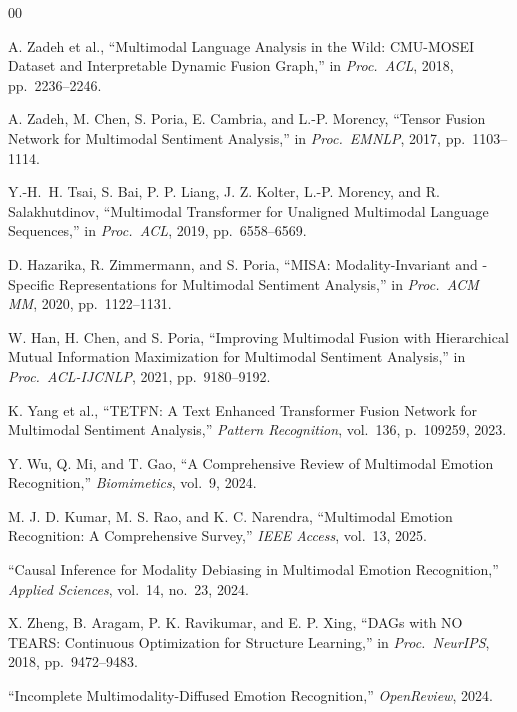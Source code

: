 \documentclass[conference]{IEEEtran}
\begin{document}
\begin{thebibliography}{00}

A. Zadeh et al., ``Multimodal Language Analysis in the Wild: CMU-MOSEI Dataset
and Interpretable Dynamic Fusion Graph,'' in \textit{Proc.\ ACL}, 2018,
pp.~2236--2246.

A. Zadeh, M. Chen, S. Poria, E. Cambria, and L.-P. Morency,
``Tensor Fusion Network for Multimodal Sentiment Analysis,''
in \textit{Proc.\ EMNLP}, 2017, pp.~1103--1114.

Y.-H.~H. Tsai, S. Bai, P. P. Liang, J. Z. Kolter, L.-P. Morency,
and R. Salakhutdinov, ``Multimodal Transformer for Unaligned Multimodal
Language Sequences,'' in \textit{Proc.\ ACL}, 2019, pp.~6558--6569.

D. Hazarika, R. Zimmermann, and S. Poria, ``MISA: Modality-Invariant and
-Specific Representations for Multimodal Sentiment Analysis,''
in \textit{Proc.\ ACM MM}, 2020, pp.~1122--1131.

W. Han, H. Chen, and S. Poria, ``Improving Multimodal Fusion with Hierarchical
Mutual Information Maximization for Multimodal Sentiment Analysis,''
in \textit{Proc.\ ACL-IJCNLP}, 2021, pp.~9180--9192.

K. Yang et al., ``TETFN: A Text Enhanced Transformer Fusion Network for
Multimodal Sentiment Analysis,'' \textit{Pattern Recognition}, vol.~136,
p.~109259, 2023.

Y. Wu, Q. Mi, and T. Gao, ``A Comprehensive Review of Multimodal Emotion
Recognition,'' \textit{Biomimetics}, vol.~9, 2024.

M. J. D. Kumar, M. S. Rao, and K. C. Narendra, ``Multimodal Emotion
Recognition: A Comprehensive Survey,'' \textit{IEEE Access}, vol.~13, 2025.

``Causal Inference for Modality Debiasing in Multimodal Emotion Recognition,''
\textit{Applied Sciences}, vol.~14, no.~23, 2024.

X. Zheng, B. Aragam, P. K. Ravikumar, and E. P. Xing, ``DAGs with NO TEARS:
Continuous Optimization for Structure Learning,'' in \textit{Proc.\ NeurIPS},
2018, pp.~9472--9483.

``Incomplete Multimodality-Diffused Emotion Recognition,''
\textit{OpenReview}, 2024.


\end{thebibliography}
\end{document}
